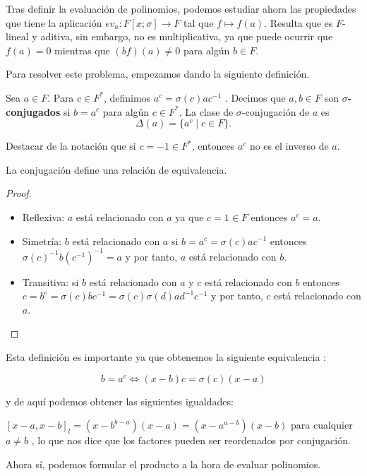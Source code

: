 Tras definir la evaluación de polinomios, podemos estudiar ahora las propiedades que tiene la aplicación $ev_a : F[x;\sigma] \rightarrow F$ tal que $f \longmapsto f(a)$. Resulta que es $F$-lineal y aditiva, sin embargo, no es multiplicativa, ya que puede ocurrir que $f(a) = 0$ mientras que $(bf)(a) \neq 0$ para algún $b \in F$. 

Para resolver este problema, empezamos dando la siguiente definición.

\begin{definition}
    Sea $a \in F$. Para $c \in F^*$, definimos $a^c = \sigma(c)ac^{-1}$ . Decimos que $a,b \in F$ son \textbf{$\sigma$-conjugados} si $b = a^c$ para algún $c \in F^*$. La clase de $\sigma$-conjugación de $a$ es 
    \[
    \Delta(a) = \{ a^c \mid c \in F \}.
    \]
\end{definition}

Destacar de la notación que si $c = -1 \in F^*$, entonces $a^c$ no es el inverso de $a$.

\begin{proposition}
    La conjugación define una relación de equivalencia.
\end{proposition}

\begin{proof}
 \begin{itemize}
    \item Reflexiva: $a$ está relacionado con $a$ ya que $c = 1 \in F$ entonces $a^c = a$.
    \item Simetría: $b$ está relacionado con $a$ si $b = a^c = \sigma(c)ac^{-1}$ entonces $ \sigma(c)^{-1}b(c^{-1})^{-1} = a$ y por tanto, $a$ está relacionado con $b$. 
    \item Transitiva: si $b$ está relacionado con $a$ y $c$ está relacionado con $b$ entonces $c = b^c = \sigma(c)bc^{-1} = \sigma(c)\sigma(d)ad^{-1}c^{-1}$ y por tanto, $c$ está relacionado con $a$.
\end{itemize} 
\end{proof}

Esta definición es importante ya que obtenemos la siguiente equivalencia :

\[ b = a^c \Leftrightarrow (x -b)c = \sigma(c)(x-a) \]

y de aquí podemos obtener las siguientes igualdades:

$ [x-a,x-b]_l = (x-b^{b-a})(x-a) = (x-a^{a-b})(x-b)$ para cualquier $a \neq b$ , lo que nos dice que los factores pueden ser reordenados por conjugación.


Ahora sí, podemos formular el producto a la hora de evaluar polinomios.

